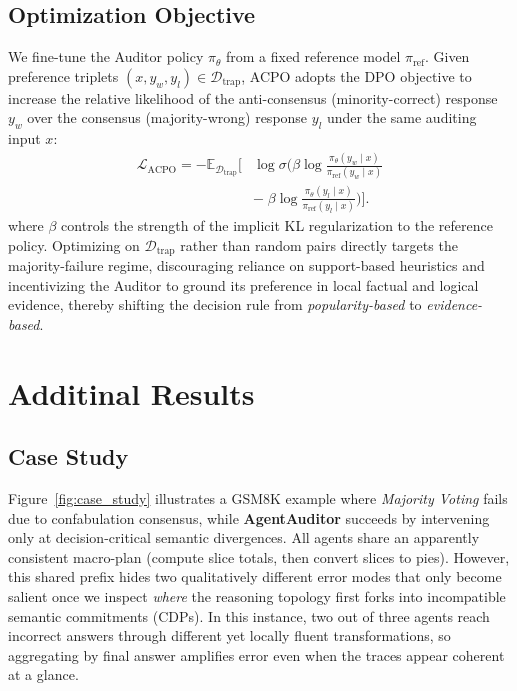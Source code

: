 \documentclass{article}
\theoremstyle{plain}
\theoremstyle{definition}
\theoremstyle{remark}
\begin{document}
\subsection{Optimization Objective}
We fine-tune the Auditor policy $\pi_{\theta}$ from a fixed reference model $\pi_{\mathrm{ref}}$. 
Given preference triplets $(x, y_w, y_l)\in\mathcal{D}_{\mathrm{trap}}$, ACPO adopts the DPO objective to increase the relative likelihood of the anti-consensus (minority-correct) response $y_w$ over the consensus (majority-wrong) response $y_l$ under the same auditing input $x$:
\begin{equation}
\begin{aligned}
\mathcal{L}_{\text{ACPO}}
= - \mathbb{E}_{\mathcal{D}_{\mathrm{trap}}}\Bigg[&
\log \sigma\!\Bigg(
\beta \log \frac{\pi_{\theta}(y_w \mid x)}{\pi_{\mathrm{ref}}(y_w \mid x)}\\
&-\; \beta \log \frac{\pi_{\theta}(y_l \mid x)}{\pi_{\mathrm{ref}}(y_l \mid x)}
\Bigg)
\Bigg]
.
\end{aligned}
\end{equation}
where $\beta$ controls the strength of the implicit KL regularization to the reference policy. 
Optimizing on $\mathcal{D}_{\mathrm{trap}}$ rather than random pairs directly targets the majority-failure regime, discouraging reliance on support-based heuristics and incentivizing the Auditor to ground its preference in local factual and logical evidence, thereby shifting the decision rule from \textit{popularity-based} to \textit{evidence-based}.



\section{Additinal Results}

\subsection{Case Study}

Figure~\ref{fig:case_study} illustrates a GSM8K example where \emph{Majority Voting} fails due to confabulation consensus, while \textbf{AgentAuditor} succeeds by intervening only at decision-critical semantic divergences. All agents share an apparently consistent macro-plan (compute slice totals, then convert slices to pies). However, this shared prefix hides two qualitatively different error modes that only become salient once we inspect \emph{where} the reasoning topology first forks into incompatible semantic commitments (CDPs). In this instance, two out of three agents reach incorrect answers through different yet locally fluent transformations, so aggregating by final answer amplifies error even when the traces appear coherent at a glance.
\end{document}
